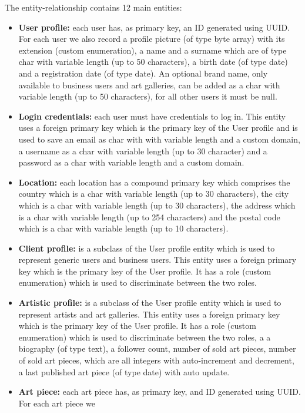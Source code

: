 The entity-relationship contains 12 main entities:
\begin{itemize}
    \item \textbf{User profile:} each user has, as primary key, an ID generated using UUID. For each user we also record
    a profile picture (of type byte array) with its extension (custom enumeration), a name and a surname which
    are of type char with variable length (up to 50 characters), a birth date (of type date) and a registration
    date (of type date). An optional brand name, only available to business users and art galleries, can be added
     as a char with variable length (up to 50 characters), for all other users it must be null.
    \item \textbf{Login credentials:} each user must have credentials to log in. This entity uses a foreign primary key 
    which is the primary key of the User profile and is used to save an email as char with with variable length 
    and a custom domain, a username as a char with variable length (up to 30 character) and a password as a char
     with variable length and a custom domain.
    \item \textbf{Location:} each location has a compound primary key which comprises the country which is a char with 
    variable length (up to 30 characters), the city which is a char with variable length (up to 30 characters), the
     address which is a char with variable length (up to 254 characters) and the postal code which is a char with 
     variable length (up to 10 characters).
    \item \textbf{Client profile:} is a subclass of the User profile entity which is used to represent generic users and 
    business users. This entity uses a foreign primary key which is the primary key of the User profile. It has a
     role (custom enumeration) which is used to discriminate between the two roles.
    \item \textbf{Artistic profile:} is a subclass of the User profile entity which is used to represent artists and art 
    galleries. This entity uses a foreign primary key which is the primary key of the User profile. It has a role 
    (custom enumeration) which is used to discriminate between the two roles, a 
    a biography (of type text), a follower count, number of sold art pieces, number of sold art pieces, which are
    all integers with auto-increment and decrement, a last published art piece (of type date) with auto update.
    \item \textbf{Art piece:} each art piece has, as primary key, and ID generated using UUID. For each art piece we 

\end{itemize}
